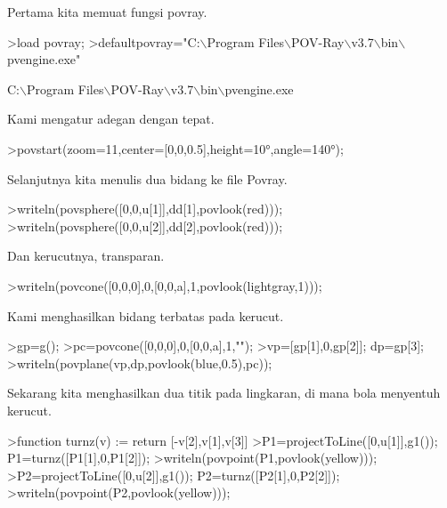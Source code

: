 \documentclass[a4paper,10pt]{article}
\begin{document}
\begin{eulernotebook}
\begin{eulercomment}
\begin{eulercomment}
\begin{eulercomment}
Pertama kita memuat fungsi povray.
\end{eulercomment}
\begin{eulerprompt}
>load povray;
>defaultpovray="C:\(\backslash\)Program Files\(\backslash\)POV-Ray\(\backslash\)v3.7\(\backslash\)bin\(\backslash\)pvengine.exe"
\end{eulerprompt}
\begin{euleroutput}
  C:\(\backslash\)Program Files\(\backslash\)POV-Ray\(\backslash\)v3.7\(\backslash\)bin\(\backslash\)pvengine.exe
\end{euleroutput}
\begin{eulercomment}
Kami mengatur adegan dengan tepat.
\end{eulercomment}
\begin{eulerprompt}
>povstart(zoom=11,center=[0,0,0.5],height=10°,angle=140°);
\end{eulerprompt}
\begin{eulercomment}
Selanjutnya kita menulis dua bidang ke file Povray.
\end{eulercomment}
\begin{eulerprompt}
>writeln(povsphere([0,0,u[1]],dd[1],povlook(red)));
>writeln(povsphere([0,0,u[2]],dd[2],povlook(red)));
\end{eulerprompt}
\begin{eulercomment}
Dan kerucutnya, transparan.
\end{eulercomment}
\begin{eulerprompt}
>writeln(povcone([0,0,0],0,[0,0,a],1,povlook(lightgray,1)));
\end{eulerprompt}
\begin{eulercomment}
Kami menghasilkan bidang terbatas pada kerucut.
\end{eulercomment}
\begin{eulerprompt}
>gp=g();
>pc=povcone([0,0,0],0,[0,0,a],1,"");
>vp=[gp[1],0,gp[2]]; dp=gp[3];
>writeln(povplane(vp,dp,povlook(blue,0.5),pc));
\end{eulerprompt}
\begin{eulercomment}
Sekarang kita menghasilkan dua titik pada lingkaran, di mana bola
menyentuh kerucut.
\end{eulercomment}
\begin{eulerprompt}
>function turnz(v) := return [-v[2],v[1],v[3]]
>P1=projectToLine([0,u[1]],g1()); P1=turnz([P1[1],0,P1[2]]);
>writeln(povpoint(P1,povlook(yellow)));
>P2=projectToLine([0,u[2]],g1()); P2=turnz([P2[1],0,P2[2]]);
>writeln(povpoint(P2,povlook(yellow)));
\end{eulerprompt}

\end{eulercomment}
\end{eulercomment}
\end{eulernotebook}
\end{document}
